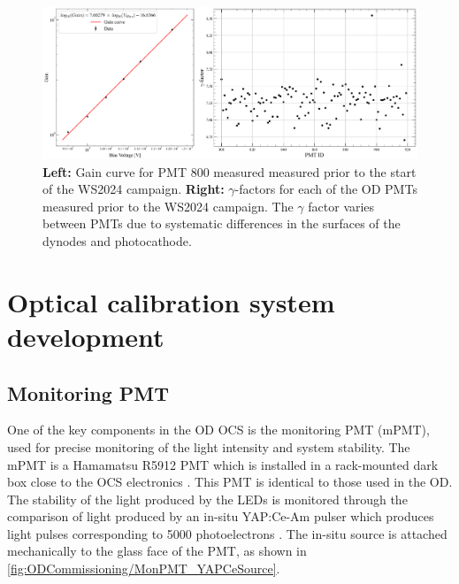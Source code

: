 \begin{figure}
    \centering
    \includegraphics[width=\linewidth]{figures/ODCommissioning/Screenshot from 2025-09-04 11-24-39.png}
    \caption[Gain curve for PMT 800 alongside the $\gamma$-factors for each of the OD PMTs measured prior to the WS2024 campaign.]{\textbf{Left:} Gain curve for PMT 800 measured measured prior to the start of the WS2024 campaign. \textbf{Right:} $\gamma$-factors for each of the OD PMTs measured prior to the WS2024 campaign. The $\gamma$ factor varies between PMTs due to systematic differences in the surfaces of the dynodes and photocathode.}
    \label{fig:ODCommissioning/gainCurve}
\end{figure}


\section{Optical calibration system development}\label{sec:ODCommissioning/OCSDevelopment}
\subsection{Monitoring PMT}\label{sec:ODCommissioning/MonitoringPMT}
One of the key components in the OD OCS is the monitoring PMT (mPMT), used for precise monitoring of the light intensity and system stability. The mPMT is a Hamamatsu R5912 PMT which is installed in a rack-mounted dark box close to the OCS electronics \cite{Turner:2021qvi}. This PMT is identical to those used in the OD. The stability of the light produced by the LEDs is monitored through the comparison of light produced by an in-situ YAP:Ce-Am pulser which produces light pulses corresponding to 5000 photoelectrons \cite{KOBAYASHI1994355}. The in-situ source is attached mechanically to the glass face of the PMT, as shown in \autoref{fig:ODCommissioning/MonPMT_YAPCeSource}.

